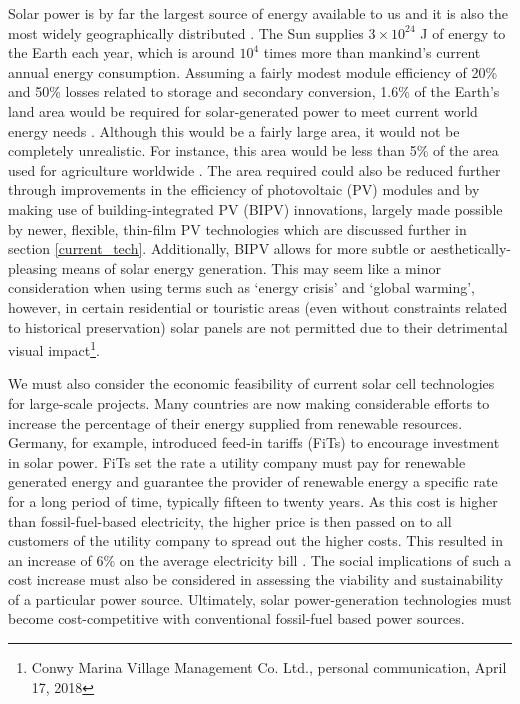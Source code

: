 \documentclass[11pt, twoside]{report}
\begin{document}
Solar power is by far the largest source of energy available to us and it is also the most widely geographically distributed \cite{inorg_pv}. The Sun supplies $3 \times 10^{24}$ J of energy to the Earth each year, which is around $10^4$ times more than mankind's current annual energy consumption. 
Assuming a fairly modest module efficiency of 20\% and 50\% losses related to storage and secondary conversion, 1.6\% of the Earth’s land area would be required for solar-generated power to meet current world energy needs \cite{newPVrev}. Although this would be a fairly large area, it would not be completely unrealistic. For instance, this area would be less than 5\% of the area used for agriculture worldwide \cite{newPVrev}. The area required could also be reduced further through improvements in the efficiency of photovoltaic (PV) modules and by making use of building-integrated PV (BIPV) innovations, largely made possible by newer, flexible, thin-film PV technologies which are discussed further in section \ref{current_tech}.
Additionally, BIPV allows for more subtle or aesthetically-pleasing means of solar energy generation. This may seem like a minor consideration when using terms such as `energy crisis' and `global warming', however, in certain residential or touristic areas (even without constraints related to historical preservation) solar panels are not permitted due to their detrimental visual impact\footnote{Conwy Marina Village Management Co. Ltd., personal communication, April 17, 2018}.

We must also consider the economic feasibility of current solar cell technologies for large-scale projects.
Many countries are now making considerable efforts to increase the percentage of their energy supplied from renewable resources. Germany, for example, introduced feed-in tariffs (FiTs) to encourage investment in solar power.
FiTs set the rate a utility company must pay for renewable generated energy and guarantee the provider of renewable energy a specific rate for a long period of time, typically fifteen to twenty years. As this cost is higher than fossil-fuel-based electricity, the higher price is then passed on to all customers of the utility company to spread out the higher costs. This resulted in an increase of 6\% on the average electricity bill \cite{Germany_Oregon}. The social implications of such a cost increase must also be considered in assessing the viability and sustainability of a particular power source.
Ultimately, solar power-generation technologies must become cost-competitive with conventional fossil-fuel based power sources.
\end{document}
